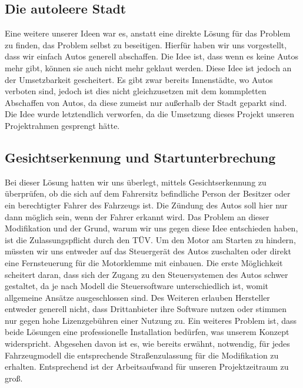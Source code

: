 \subsection{Die autoleere Stadt}
Eine weitere unserer Ideen war es, anstatt eine direkte Lösung für das Problem zu finden, das Problem selbst zu beseitigen. Hierfür haben wir uns vorgestellt, dass wir einfach Autos generell abschaffen. Die Idee ist, dass wenn es keine Autos mehr gibt, können sie auch nicht mehr geklaut werden. Diese Idee ist jedoch an der Umsetzbarkeit gescheitert. Es gibt zwar bereits Innenstädte, wo Autos verboten sind, jedoch ist dies nicht gleichzusetzen mit dem kommpletten Abschaffen von Autos, da diese zumeist nur außerhalb der Stadt geparkt sind. Die Idee wurde letztendlich verworfen, da die Umsetzung dieses Projekt unseren Projektrahmen gesprengt hätte. 
\subsection{Gesichtserkennung und Startunterbrechung}
Bei dieser Lösung hatten wir uns überlegt, mittels Gesichtserkennung zu überprüfen, ob die sich auf dem Fahrersitz befindliche Person der Besitzer oder ein berechtigter Fahrer des Fahrzeugs ist. Die Zündung des Autos soll hier nur dann möglich sein, wenn der Fahrer erkannt wird. Das Problem an dieser Modifikation und der Grund, warum wir uns gegen diese Idee entschieden haben, ist die Zulassungspflicht durch den TÜV. Um den Motor am Starten zu hindern, müssten wir uns entweder auf das Steuergerät des Autos zuschalten oder direkt eine Fernsteuerung für die Motorklemme mit einbauen. Die erste Möglichkeit scheitert daran, dass sich der Zugang zu den Steuersystemen des Autos schwer gestaltet, da je nach Modell die Steuersoftware unterschiedlich ist, womit allgemeine Ansätze ausgeschlossen sind. Des Weiteren erlauben Hersteller entweder generell nicht, dass Drittanbieter ihre Software nutzen oder stimmen nur gegen hohe Lizenzgebühren einer Nutzung zu. Ein weiteres Problem ist, dass beide Lösungen eine professionelle Installation bedürfen, was unserem Konzept widerspricht. Abgesehen davon ist es, wie bereits erwähnt, notwendig, für jedes Fahrzeugmodell die entsprechende Straßenzulassung für die Modifikation zu erhalten. Entsprechend ist der Arbeitsaufwand für unseren Projektzeitraum zu groß. 